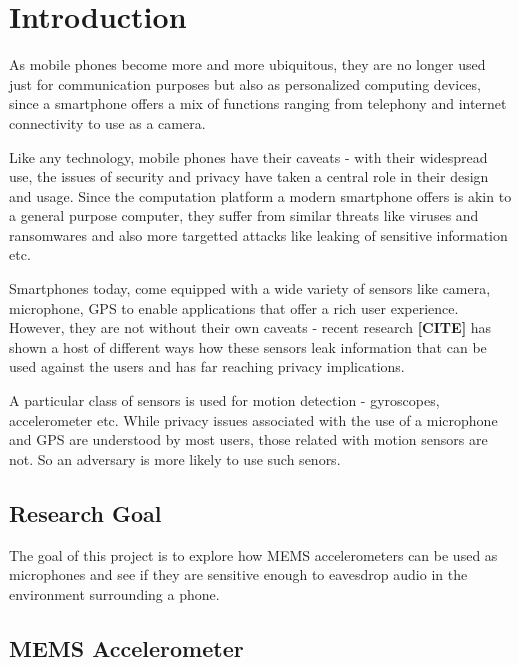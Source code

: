 
\chapter{Introduction}

As mobile phones become more and more ubiquitous, they are no longer used just for communication purposes but also as personalized computing devices, since a smartphone offers a mix of functions ranging from telephony and internet connectivity to use as a camera.

Like any technology, mobile phones have their caveats - with their widespread use, the issues of security and privacy have taken a central role in their design and usage. Since the computation platform a modern smartphone offers is akin to a general purpose computer, they suffer from similar threats like viruses and ransomwares and also more targetted attacks like leaking of sensitive information etc.

Smartphones today, come equipped with a wide variety of sensors like camera, microphone, GPS to enable applications that offer a rich user experience. However, they are not without their own caveats - recent research
\textbf{[CITE]} has shown a host of different ways how these sensors leak information that can be used against the users and has far reaching privacy implications.

A particular class of sensors is used for motion detection - gyroscopes, accelerometer etc. While privacy issues associated with the use of a microphone and GPS are understood by most users, those related with motion sensors are not. So an adversary is more likely to use such senors.


\section{Research Goal}

\begin{adjustwidth}{1cm}{1cm}
The goal of this project is to explore how MEMS accelerometers can be used as microphones and see if they are sensitive enough to eavesdrop audio in the environment surrounding a phone.
\end{adjustwidth}

\newpage

\section{MEMS Accelerometer}

